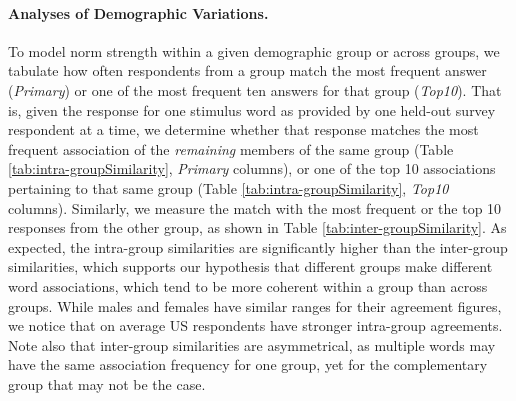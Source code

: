 \documentclass[11pt,letterpaper]{article}
\newcommand{\FIXME}[1]{\textcolor{red}{#1}}
\begin{document}



\paragraph {Analyses of Demographic Variations.} To model norm strength within a given demographic group or across groups, we tabulate how often respondents from a group match the most frequent answer ({\it Primary}) or one of the most frequent ten answers for that group ({\it Top10}). That is, given the response for one stimulus word as provided by one held-out survey respondent at a time, we determine whether that response matches the most frequent association of the {\it remaining} members of the same group %
(Table \ref{tab:intra-groupSimilarity}, {\it Primary} columns), or one of the top 10 associations pertaining to that same group
(Table \ref{tab:intra-groupSimilarity}, {\it Top10} columns). Similarly, we measure the match with the most frequent or the top 10 responses from the other group, as shown in Table \ref{tab:inter-groupSimilarity}. As expected, the intra-group similarities are significantly higher than the inter-group similarities, which supports our hypothesis that different groups make different word associations, which tend to be more coherent within a group than across groups. While males and females have similar ranges for their agreement figures, we notice that on average US respondents have stronger intra-group agreements. Note also that inter-group similarities are asymmetrical, as multiple words may have the same association frequency for one group, yet for the complementary group that may not be the case.
\end{document}
